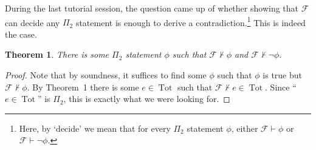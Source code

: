 \documentclass{article}
\newtheorem{theorem}{Theorem}
\DeclareMathOperator{\Tot}{Tot}
\begin{document}
  During the last tutorial session, the question came up of whether showing that $\mathcal{F}$ can decide any $\Pi_2$
  statement is enough to derive a contradiction.\footnote{Here, by `decide' we mean that for every $\Pi_2$ statement $\phi$,
  either $\mathcal{F} \vdash \phi$ or $\mathcal{F} \vdash \neg \phi$.}  This is indeed the case.

  \begin{theorem}
    There is some $\Pi_2$ statement $\phi$ such that $\mathcal{F} \not \vdash
    \phi$ and $\mathcal{F} \not \vdash \neg \phi$.
  \end{theorem}

  \begin{proof}
    Note that by soundness, it suffices to find some $\phi$ such that $\phi$ is true but $\mathcal{F} \not
    \vdash \phi$.  By Theorem~1 there is some $e \in \Tot$ such that $\mathcal{F} \not \vdash e \in \Tot$.  Since
    ``$e \in \Tot$'' is $\Pi_2$, this is exactly what we were looking for.
  \end{proof}
\end{document}
